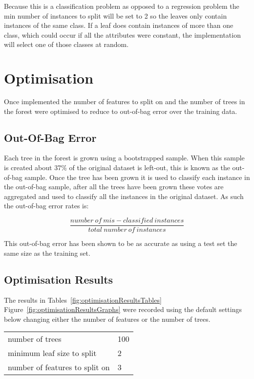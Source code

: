 		Because this is a classification problem as opposed to a regression problem the min number of instances to split will be set to 2 so the leaves only contain instances of the same class. If a leaf does contain instances of more than one class, which could occur if all the attributes were constant, the implementation will select one of those classes at random.\\
						
	\section{Optimisation}
		Once implemented the number of features to split on and the number of trees in the forest were optimised to reduce to out-of-bag error over the training data.
		
		\subsection{Out-Of-Bag Error}
			Each tree in the forest is grown using a bootstrapped sample. When this sample is created about 37\% of the original dataset is left-out, this is known as the out-of-bag sample. Once the tree has been grown it is used to classify each instance in the out-of-bag sample, after all the trees have been grown these votes are aggregated and used to classify all the instances in the original dataset. As such the out-of-bag error rates is:
			
			$$\frac{number\ of\ mis-classified\ instances}{total\ number\ of\ instances}$$ 

This out-of-bag error has been shown to be as accurate as using a test set the same size as the training set\cite{breiman1996out}.\\ 

		\subsection{Optimisation Results}
		The results in Tables~\ref{fig:optimisationResultsTables} Figure~\ref{fig:optimisationResultsGraphs} were recorded using the default settings below changing either the number of features or the number of trees.

	\begin{table}[h]
		\begin{tabular}{ll}
			{number of trees} 				& 100\\
			{minimum leaf size to split}		& 2\\
			{number of features to split on}	& 3\\
		\end{tabular}
	\end{table}		
		
